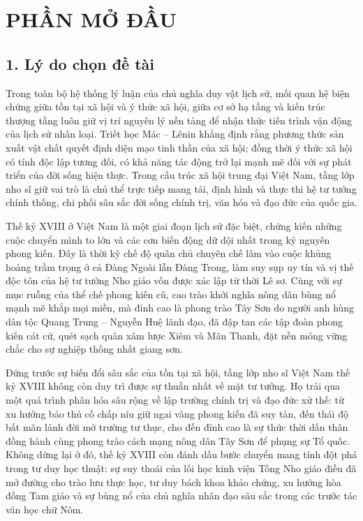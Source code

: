 \section*{PHẦN MỞ ĐẦU}

\subsection*{1. Lý do chọn đề tài}

Trong toàn bộ hệ thống lý luận của chủ nghĩa duy vật lịch sử, mối quan hệ biện chứng giữa tồn tại xã hội và ý thức xã hội, giữa cơ sở hạ tầng và kiến trúc thượng tầng luôn giữ vị trí nguyên lý nền tảng để nhận thức tiến trình vận động của lịch sử nhân loại. Triết học Mác -- Lênin khẳng định rằng phương thức sản xuất vật chất quyết định diện mạo tinh thần của xã hội; đồng thời ý thức xã hội có tính độc lập tương đối, có khả năng tác động trở lại mạnh mẽ đối với sự phát triển của đời sống hiện thực. Trong cấu trúc xã hội trung đại Việt Nam, tầng lớp nho sĩ giữ vai trò là chủ thể trực tiếp mang tải, định hình và thực thi hệ tư tưởng chính thống, chi phối sâu sắc đời sống chính trị, văn hóa và đạo đức của quốc gia.

Thế kỷ XVIII ở Việt Nam là một giai đoạn lịch sử đặc biệt, chứng kiến những cuộc chuyển mình to lớn và các cơn biến động dữ dội nhất trong kỷ nguyên phong kiến. Đây là thời kỳ chế độ quân chủ chuyên chế lâm vào cuộc khủng hoảng trầm trọng ở cả Đàng Ngoài lẫn Đàng Trong, làm suy sụp uy tín và vị thế độc tôn của hệ tư tưởng Nho giáo vốn được xác lập từ thời Lê sơ. Cùng với sự mục ruỗng của thể chế phong kiến cũ, cao trào khởi nghĩa nông dân bùng nổ mạnh mẽ khắp mọi miền, mà đỉnh cao là phong trào Tây Sơn do người anh hùng dân tộc Quang Trung -- Nguyễn Huệ lãnh đạo, đã đập tan các tập đoàn phong kiến cát cứ, quét sạch quân xâm lược Xiêm và Mãn Thanh, đặt nền móng vững chắc cho sự nghiệp thống nhất giang sơn.

Đứng trước sự biến đổi sâu sắc của tồn tại xã hội, tầng lớp nho sĩ Việt Nam thế kỷ XVIII không còn duy trì được sự thuần nhất về mặt tư tưởng. Họ trải qua một quá trình phân hóa sâu rộng về lập trường chính trị và đạo đức xử thế: từ xu hướng bảo thủ cố chấp níu giữ ngai vàng phong kiến đã suy tàn, đến thái độ bất mãn lánh đời mở trường tư thục, cho đến đỉnh cao là sự thức thời dấn thân đồng hành cùng phong trào cách mạng nông dân Tây Sơn để phụng sự Tổ quốc. Không dừng lại ở đó, thế kỷ XVIII còn đánh dấu bước chuyển mang tính đột phá trong tư duy học thuật: sự suy thoái của lối học kinh viện Tống Nho giáo điều đã mở đường cho trào lưu thực học, tư duy bách khoa khảo chứng, xu hướng hòa đồng Tam giáo và sự bùng nổ của chủ nghĩa nhân đạo sâu sắc trong các trước tác văn học chữ Nôm.

